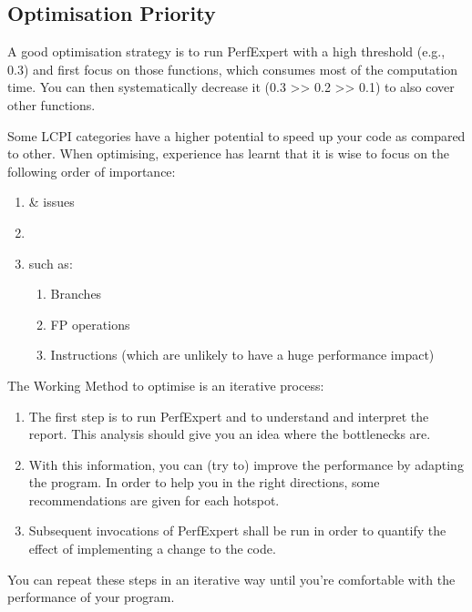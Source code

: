 \subsection{Optimisation Priority}
\label{subsec:Optimization_Priority}

A good optimisation strategy is to run PerfExpert with a high threshold (e.g., 0.3) and first focus on those functions, which consumes most of the computation time. You can then systematically decrease it (0.3 >> 0.2 >> 0.1) to also cover other functions.

Some LCPI categories have a higher potential to speed up your code as compared to other. When optimising, experience has learnt that it is wise to focus on the following order of importance:

\begin{enumerate}
  \item  {} \&  issues
  \item  {}
  \item  {} such as:
  \begin{enumerate}
    \item  Branches
    \item  FP operations
    \item  Instructions (which are unlikely to have a huge performance impact)
  \end{enumerate}
\end{enumerate}

The Working Method to optimise is an iterative process:

\begin{enumerate}
  \item  {} The first step is to run PerfExpert and to understand and interpret the report. This analysis should give you an idea where the bottlenecks are.
  \item  {} With this information, you can (try to) improve the performance by adapting the program. In order to help you in the right directions, some recommendations are given for each hotspot.
  \item  {} Subsequent invocations of PerfExpert shall be run in order to quantify the effect of implementing a change to the code.
\end{enumerate}

You can repeat these steps in an iterative way until you're comfortable with the performance of your program.

